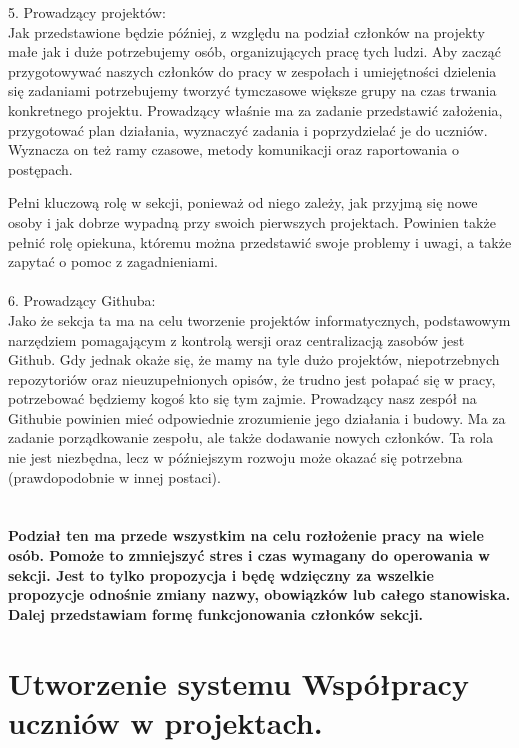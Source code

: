 \documentclass[9pt,a4paper]{report}
\begin{document}
 

5. Prowadzący projektów:\\ 

Jak przedstawione będzie później, z względu na podział członków na projekty małe jak i duże potrzebujemy osób, organizujących pracę tych ludzi. Aby zacząć przygotowywać naszych członków do pracy w zespołach i umiejętności dzielenia się zadaniami potrzebujemy tworzyć tymczasowe większe grupy na czas trwania konkretnego projektu. Prowadzący właśnie ma za zadanie przedstawić założenia, przygotować plan działania, wyznaczyć zadania i poprzydzielać je do uczniów. Wyznacza on też ramy czasowe, metody komunikacji oraz raportowania o postępach. 

Pełni kluczową rolę w sekcji, ponieważ od niego zależy, jak przyjmą się nowe osoby i jak dobrze wypadną przy swoich pierwszych projektach. Powinien także pełnić rolę opiekuna, któremu można przedstawić swoje problemy i uwagi, a także zapytać o pomoc z zagadnieniami.\\\\ 

 

6. Prowadzący Githuba:\\ 

Jako że sekcja ta ma na celu tworzenie projektów informatycznych, podstawowym narzędziem pomagającym z kontrolą wersji oraz centralizacją zasobów jest Github. Gdy jednak okaże się, że mamy na tyle dużo projektów, niepotrzebnych repozytoriów oraz nieuzupełnionych opisów, że trudno jest połapać się w pracy, potrzebować będziemy kogoś kto się tym zajmie. Prowadzący nasz zespół na Githubie powinien mieć odpowiednie zrozumienie jego działania i budowy. Ma za zadanie porządkowanie zespołu, ale także dodawanie nowych członków. Ta rola nie jest niezbędna, lecz w późniejszym rozwoju może okazać się potrzebna (prawdopodobnie w innej postaci).\\\\\\ 

  

\textbf{Podział ten ma przede wszystkim na celu rozłożenie pracy na wiele osób. Pomoże to zmniejszyć stres i czas wymagany do operowania w sekcji. Jest to tylko propozycja i będę wdzięczny za wszelkie propozycje odnośnie zmiany nazwy, obowiązków lub całego stanowiska. Dalej przedstawiam formę funkcjonowania członków sekcji.} 

 

\section{Utworzenie systemu Współpracy uczniów w projektach.} 
\end{document}
